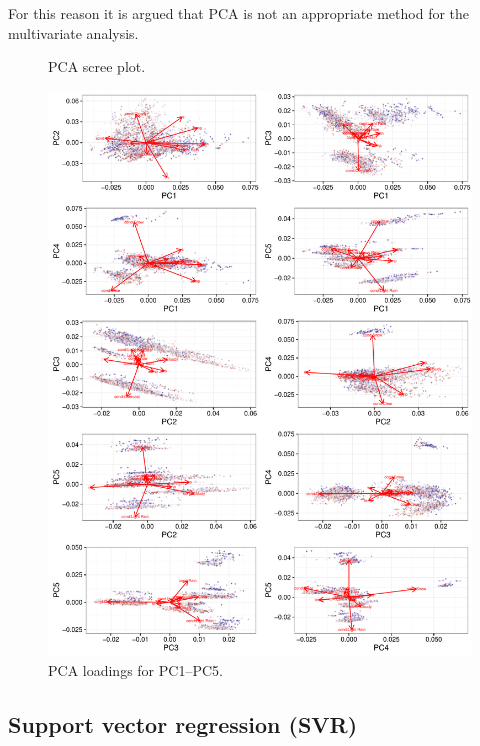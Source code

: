 For this reason it is argued that PCA is not an appropriate method for the multivariate analysis.
\begin{figure}[!ht]
    \center
    
    \caption{PCA scree plot.}
    \label{fig:pca_screeplot}
\end{figure}

\begin{figure}[!p]
    \center
    \includegraphics[width=\textwidth]{../plots/pca_loadings}
    \caption{PCA loadings for PC1--PC5.}
    \label{fig:pca_loadings}
\end{figure}

\subsection{Support vector regression (SVR)}